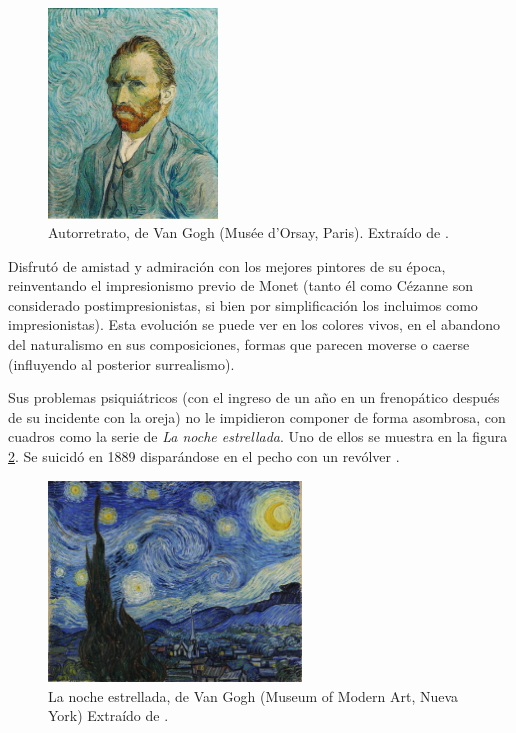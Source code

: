 \documentclass[../main.tex]{subfiles}
\begin{document}
\begin{figure}
    \centering
    \includegraphics[width=0.4\textwidth]{imagenes/Autorretrato.jpg}
    \caption[Autorretrato, de Van Gogh]{Autorretrato, de Van Gogh (Musée d'Orsay, Paris). Extraído de \cite{Gogh1889}.}
    \label{fig:van_gogh_autorretrato}
\end{figure}

Disfrutó de amistad y admiración con los mejores pintores de su época, reinventando el impresionismo previo de Monet (tanto él como Cézanne son considerado postimpresionistas, si bien por simplificación los incluimos como impresionistas).
Esta evolución se puede ver en los colores vivos, en el abandono del naturalismo en sus composiciones, formas que parecen moverse o caerse (influyendo al posterior surrealismo). \newline

Sus problemas psiquiátricos (con el ingreso de un año en un frenopático después de su incidente con la oreja) no le impidieron componer de forma asombrosa, con cuadros como la serie de \textit{La noche estrellada}. Uno de ellos se muestra en la figura \ref{fig:van_gogh_noche_estrellada}. Se suicidó en 1889 disparándose en el pecho con un revólver \cite{Barreira2019}.

\begin{figure}[h!]
    \centering
    \includegraphics[width=0.6\textwidth]{imagenes/La noche estrellada.JPG}
    \caption[La noche estrellada, de Van Gogh]{La noche estrellada, de Van Gogh (Museum of Modern Art, Nueva York) Extraído de \cite{VanGogh1889}.}
    \label{fig:van_gogh_noche_estrellada}
\end{figure}
\end{document}
